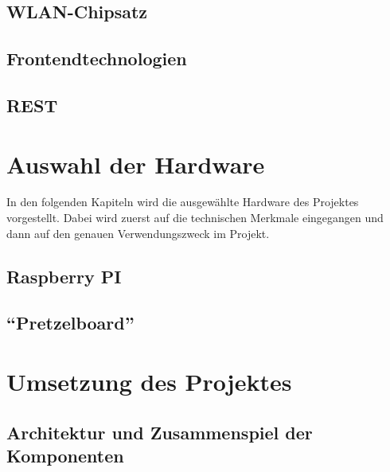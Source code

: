 \documentclass[ngerman]{scrartcl} %
\begin{document}
\subsection{WLAN-Chipsatz}
\label{sec:WLAN-CHipsatz-1} 

\subsection{Frontendtechnologien}
\label{sec:Frontendtechnologien-1}
 
\subsection{REST}        
\label{sec:REST-1}  

\cite{Tilkov.2015}
  
\newpage
 
\section{Auswahl der Hardware}        
\label{sec:Auswahl der Hardware-1}  

In den folgenden Kapiteln wird die ausgewählte Hardware des Projektes vorgestellt. Dabei wird zuerst auf die technischen Merkmale eingegangen und dann auf den genauen Verwendungszweck im Projekt. 

\subsection{Raspberry PI}        
\label{sec:Raspberry PI-1} 



\subsection{``Pretzelboard''}        
\label{sec:''Pretzelboard''-1} 



\section{Umsetzung des Projektes}        
\label{sec:Umsetzung des Projektes-1}  

\subsection{Architektur und Zusammenspiel der Komponenten}        
\label{sec:Architektur und Zusammenspiel der Komponenten-1} 
\end{document}
